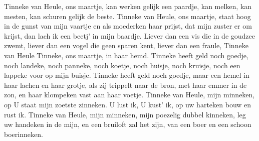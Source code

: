 \beginverse*
Tinneke van Heule, ons maartje,
kan werken gelijk een paardje,
kan melken, kan mesten,
kan schuren gelijk de beste.
Tinneke van Heule, ons maartje,
staat hoog in de gunst van mijn vaartje
en als moederken haar prijst, dat mijn zuster er om krijst,
dan lach ik een beetj’ in mijn baardje.
\endverse
\beginchorus
Liever dan een vis die in de goudzee zwemt,
liever dan een vogel die geen sparen kent,
liever dan een fraule, Tinneke van Heule
Tinneke, ons maartje, in haar hemd. 
\endchorus
\beginverse*
Tinneke heeft geld noch goedje, 
noch landeke, noch panneke, noch koetje,
noch huisje, noch kruisje,
noch een lappeke voor op mijn buisje.
Tinneke heeft geld noch goedje,
maar een hemel in haar lachen en haar grotje,
als zij trippelt naar de bron, met haar emmer in de zon,
en haar klompeken vast aan haar voetje.
\endverse
\beginverse*
Tinneke van Heule, mijn minneken,
op U staat mijn zoetste zinneken.
U lust ik, U kust’ ik, 
op uw harteken bouw en rust ik.
Tinneke van Heule, mijn minneken,
mijn poezelig dubbel kinneken,
leg uw handeken in de mijn, en een bruiloft zal het zijn,
van een boer en een schoon boerinneken.
\endverse
\endsong 